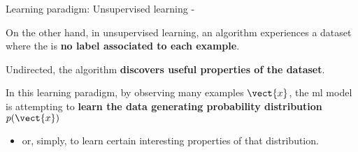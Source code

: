 %
%
%

\begin{frame}[t,allowframebreaks]{
    Learning paradigm: Unsupervised learning - }

    On the other hand, 
    in \gls{unsupervised learning},
    an algorithm experiences a dataset where the is 
    {\bf no label associated to each example}.\\
    \vspace{0.2cm}

    Undirected, the algorithm 
    {\bf discovers useful properties of the dataset}.\\
    \vspace{0.2cm}

    In this learning paradigm, by observing many 
    examples ${\vect{x}}$, the \gls{ml} model is attempting to
    {\bf learn the data generating probability 
    distribution $p(\vect{x})$} 
    \begin{itemize}
      \item or, simply, to learn certain interesting properties of that distribution.\\
    \end{itemize}
    

\end{frame}